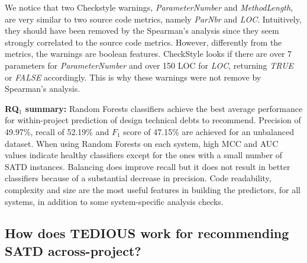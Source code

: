 We notice that two Checkstyle warnings, \textit{ParameterNumber} and \textit{MethodLength}, are very similar to two source code metrics, namely \textit{ParNbr} and \textit{LOC}. Intuitively, they should have been removed by the Spearman's analysis since they seem strongly correlated to the source code metrics. However, differently from the metrics, the warnings are boolean features. CheckStyle looks if there are over 7 parameters for \textit{ParameterNumber} and over 150 LOC for \textit{LOC}, returning \textit{TRUE} or \textit{FALSE} accordingly. This is why these warnings were not remove by Spearman's analysis.

\begin{mdframed}
	{\bf RQ$_1$ summary:} Random Forests classifiers achieve the best average performance for within-project prediction of design technical debts to recommend. Precision of 49.97\%, recall of 52.19\% and $F_1$ score of 47.15\% are achieved for an unbalanced dataset. When using Random Forests on each system, high MCC and AUC values indicate healthy classifiers except for the ones with a small number of SATD instances. Balancing does improve recall but it does not result in better classifiers because of a substantial decrease in precision. Code readability, complexity and size are the most useful features in building the predictors, for all systems, in addition to some system-specific analysis checks.
\end{mdframed}

\subsection{How does TEDIOUS work for recommending SATD across-project?}


